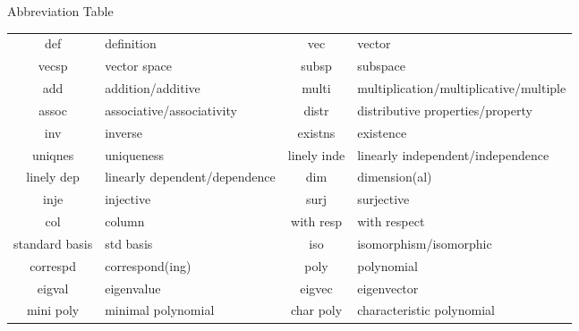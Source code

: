 \begin{large}
{\begin{center}
\vspace{24pt}
{\Large Abbreviation Table}\vspace{8pt}\par
\!\!\!\!\!\!\!\!\!\!\!\!\!\!\begin{tabularx}{1.1\textwidth} { 
		| c |
		| >{\raggedright\arraybackslash}X | c |
		| >{\raggedright\arraybackslash}X| }
	\hline
def&			definition & vec&			vector\\
vecsp&			vector space & subsp&			subspace\\
add&			addition/additive & multi&			multiplication/multiplicative/multiple\\
assoc&			associative/associativity & distr&			distributive properties/property\\
inv&			inverse & existns&		existence\\
uniqnes&		uniqueness & linely inde&	linearly independent/independence\\
linely dep&		linearly dependent/dependence & dim&			dimension(al)\\
inje&			injective & surj&			surjective\\
col&			column & with resp&		with respect\\
standard basis& std basis & iso&			isomorphism/isomorphic\\
correspd&		correspond(ing) & poly&			polynomial\\
eigval&			eigenvalue & eigvec&			eigenvector\\
mini poly&		minimal polynomial & char poly&		characteristic polynomial\\\hline
\end{tabularx}
\end{center}

\clearpage
}{}





\end{large}


